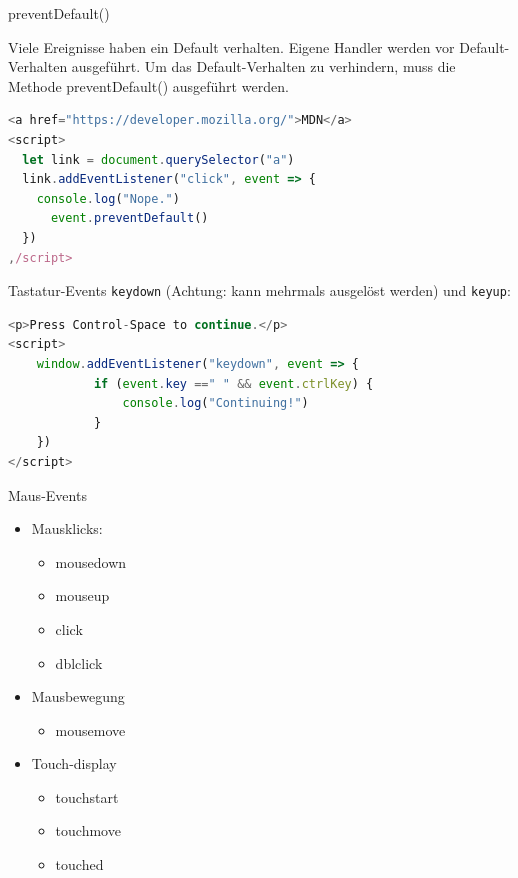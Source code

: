 \begin{examplecode}{preventDefault()}

Viele Ereignisse haben ein Default verhalten. Eigene Handler werden vor Default-Verhalten ausgeführt. Um das Default-Verhalten zu verhindern, muss die Methode preventDefault() ausgeführt werden.
\begin{lstlisting}[language=JavaScript, style=basesmol]
<a href="https://developer.mozilla.org/">MDN</a>
<script>
  let link = document.querySelector("a")
  link.addEventListener("click", event => {
    console.log("Nope.")
      event.preventDefault()
  })
,/script>
\end{lstlisting}
\end{examplecode}

\begin{definition}{Tastatur-Events}
\texttt{keydown} (Achtung: kann mehrmals ausgelöst werden) und \texttt{keyup}:
\begin{lstlisting}[language=JavaScript, style=basesmol]
<p>Press Control-Space to continue.</p>
<script>
    window.addEventListener("keydown", event => {
            if (event.key ==" " && event.ctrlKey) {
                console.log("Continuing!")
            }
    })
</script>
\end{lstlisting}
\end{definition}

\begin{definition}{Maus-Events}
  \begin{minipage}{0.45\linewidth}
  \begin{itemize}
  \item Mausklicks:
  \begin{itemize}
    \item mousedown
    \item mouseup
    \item click
    \item dblclick
  \end{itemize}
  \end{itemize}
  \end{minipage}
  \begin{minipage}{0.5\linewidth}
    \begin{itemize}
    \item Mausbewegung
    \begin{itemize}
      \item mousemove
    \end{itemize}
    \item Touch-display
    \begin{itemize}
      \item touchstart
      \item touchmove
      \item touched
    \end{itemize}
    \end{itemize}
    \end{minipage}
\end{definition}


